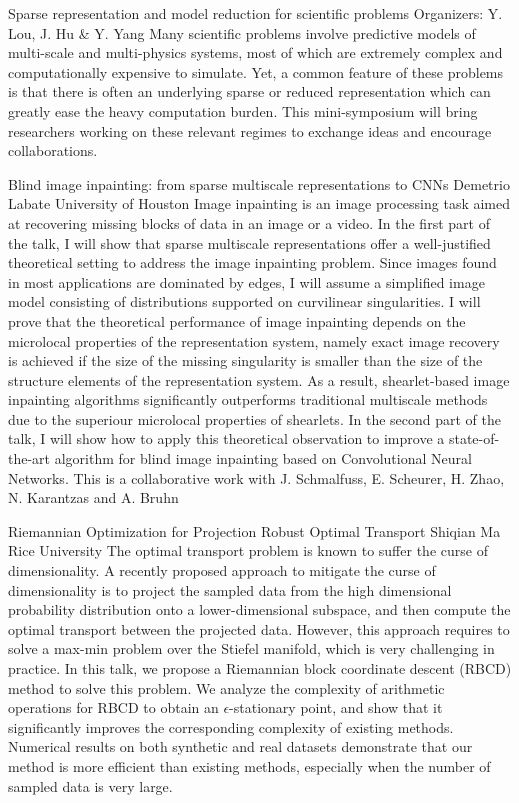 \label{mini08}

\miniabs
{Sparse representation and model reduction for scientific problems}
{Organizers: Y. Lou, J. Hu \& Y. Yang}
{Many scientific problems involve predictive models of multi-scale and multi-physics systems, most of which are extremely complex and computationally expensive to simulate. Yet, a common feature of these problems is that there is often an underlying sparse or reduced representation which can greatly ease the heavy computation burden. This mini-symposium will bring researchers working on these relevant regimes to exchange ideas and encourage collaborations.}



\begin{addmargin}[2em]{0em}
\vspace{2ex}
\abs
{Blind image inpainting: from sparse multiscale representations to CNNs}
{Demetrio Labate}
{University of Houston}
{Image inpainting is an image processing task aimed at recovering missing blocks of data in an image or a video. In the first part of the talk, I will show that sparse multiscale representations offer a well-justified theoretical setting to address the image inpainting problem. Since images found in most applications are dominated by edges, I will assume a simplified image model consisting of distributions supported on curvilinear singularities. I will prove that the theoretical performance of image inpainting depends on the microlocal properties of the representation system, namely exact image recovery is achieved if the size of the missing singularity is smaller than the size of the structure elements of the representation system. As a result, shearlet-based image inpainting algorithms significantly outperforms traditional multiscale methods due to the superiour microlocal properties of shearlets. In the second part of the talk, I will show how to apply this theoretical observation to improve a state-of-the-art algorithm for blind image inpainting based on Convolutional Neural Networks.  This is a collaborative work with J. Schmalfuss, E. Scheurer, H. Zhao, N. Karantzas and A. Bruhn}


\vspace{1.5ex}
\abs
{Riemannian Optimization for Projection Robust Optimal Transport}
{Shiqian Ma}
{Rice University}
{The optimal transport problem is known to suffer the curse of dimensionality. A recently proposed approach to mitigate the curse of dimensionality is to project the sampled data from the high dimensional probability distribution onto a lower-dimensional subspace, and then compute the optimal transport between the projected data. However, this approach requires to solve a max-min problem over the Stiefel manifold, which is very challenging in practice. In this talk, we propose a Riemannian block coordinate descent (RBCD) method to solve this problem. We analyze the complexity of arithmetic operations for RBCD to obtain an $\epsilon$-stationary point, and show that it significantly improves the corresponding complexity of existing methods. Numerical results on both synthetic and real datasets demonstrate that our method is more efficient than existing methods, especially when the number of sampled data is very large.}



\end{addmargin}

